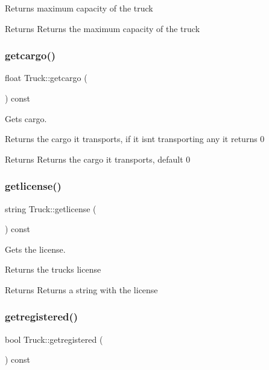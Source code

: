 Returns maximum capacity of the truck

\begin{DoxyReturn}{Returns}
Returns the maximum capacity of the truck 
\end{DoxyReturn}
\mbox{\label{class_truck_a3936315853876f84c85c4ffff194e1a5}} 
\subsubsection{\texorpdfstring{getcargo()}{getcargo()}}
{\footnotesize\ttfamily float Truck\+::getcargo (\begin{DoxyParamCaption}{ }\end{DoxyParamCaption}) const}



Gets cargo. 

Returns the cargo it transports, if it isnt transporting any it returns 0

\begin{DoxyReturn}{Returns}
Returns the cargo it transports, default 0 
\end{DoxyReturn}
\mbox{\label{class_truck_ae76a7ae2343557680ae915c6c6d42ff8}} 
\subsubsection{\texorpdfstring{getlicense()}{getlicense()}}
{\footnotesize\ttfamily string Truck\+::getlicense (\begin{DoxyParamCaption}{ }\end{DoxyParamCaption}) const}



Gets the license. 

Returns the truck\textquotesingle{}s license

\begin{DoxyReturn}{Returns}
Returns a string with the license 
\end{DoxyReturn}
\mbox{\label{class_truck_a830838ed22465cf27f56b911c3fadf13}} 
\subsubsection{\texorpdfstring{getregistered()}{getregistered()}}
{\footnotesize\ttfamily bool Truck\+::getregistered (\begin{DoxyParamCaption}{ }\end{DoxyParamCaption}) const}



